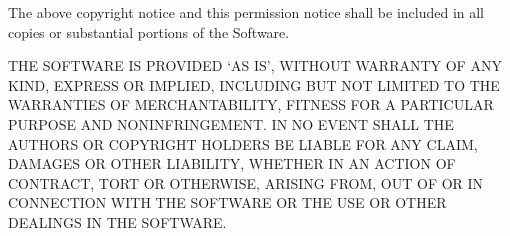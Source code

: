 \documentclass[titlepage]{article}
\begin{document}
		The above copyright notice and this permission notice shall be included in all copies or substantial portions of the Software.
		\newline

		THE SOFTWARE IS PROVIDED `AS IS', WITHOUT WARRANTY OF ANY KIND, EXPRESS OR IMPLIED, INCLUDING BUT NOT LIMITED TO THE WARRANTIES OF MERCHANTABILITY, FITNESS FOR A PARTICULAR PURPOSE AND NONINFRINGEMENT. IN NO EVENT SHALL THE AUTHORS OR COPYRIGHT HOLDERS BE LIABLE FOR ANY CLAIM, DAMAGES OR OTHER LIABILITY, WHETHER IN AN ACTION OF CONTRACT, TORT OR OTHERWISE, ARISING FROM, OUT OF OR IN CONNECTION WITH THE SOFTWARE OR THE USE OR OTHER DEALINGS IN THE SOFTWARE.
\end{document}
